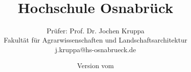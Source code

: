 \usepackage[scaled=.90]{helvet} 
\usepackage{fancyhdr}
\usepackage{lastpage}
\usepackage{hyperref}
\hypersetup{
    colorlinks=true,       %
    linkcolor=black,          %
    urlcolor=magenta           %
}
\renewcommand{\familydefault}{\sfdefault}

\title{
\large \exammodule \\[5Ex]
\Huge \examtitle \\[2Ex] 
\Large Hochschule Osnabr{\"u}ck
}
\author{Pr{\"u}fer: Prof. Dr. Jochen Kruppa \\
Fakult{\"a}t f{\"u}r Agrarwissenschaften und Landschaftsarchitektur \\ 
j.kruppa@hs-osnabrueck.de}
\date{Version vom \examdate}

\renewcommand{\headrulewidth}{0pt}
\renewcommand{\footrulewidth}{0pt}
\pagestyle{fancy}

\fancyhf{}
\fancyhead[L]{}
\fancyhead[R]{}
\fancyfoot[R]{\thepage}
\fancyfoot[L]{\footnotesize \examtitle}


\usepackage{arevtext,arevmath}

\newcommand\Tstrut{\rule{0pt}{2.6ex}}         %
\newcommand\Bstrut{\rule[-0.9ex]{0pt}{0pt}}   %
\def\strut{\Tstrut\Bstrut}
